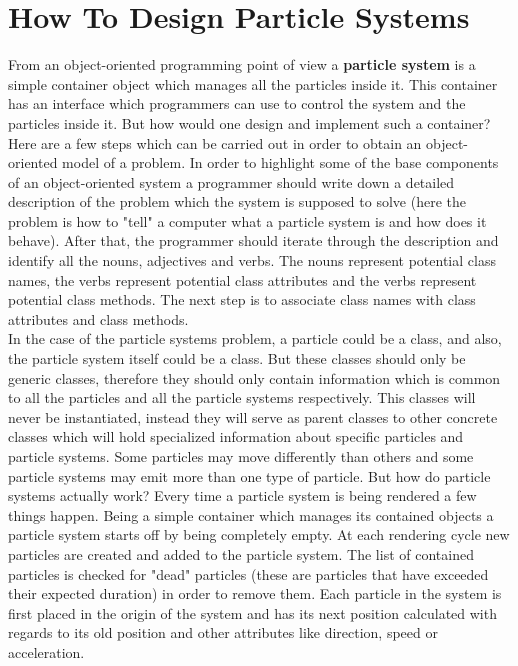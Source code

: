 \section{How To Design Particle Systems}
From an object-oriented programming point of view a \textbf{particle system} is a simple container object which manages all the particles inside it. This container has an interface which programmers can use to control the system and the particles inside it. But how would one design and implement such a container?\\

Here are a few steps which can be carried out in order to obtain an object-oriented model of a problem. In order to highlight some of the base components of an object-oriented system a programmer should write down a detailed description of the problem which the system is supposed to solve (here the problem is how to "tell" a computer what a particle system is and how does it behave). After that, the programmer should iterate through the description and identify all the nouns, adjectives and verbs. The nouns represent potential class names, the verbs represent potential class attributes and the verbs represent potential class methods. The next step is to associate class names with class attributes and class methods.\\

In the case of the particle systems problem, a particle could be a class, and also, the particle system itself could be a class. But these classes should only be generic classes, therefore they should only contain information which is common to all the particles and all the particle systems respectively. This classes will never be instantiated, instead they will serve as parent classes to other concrete classes which will hold specialized information about specific particles and particle systems. Some particles may move differently than others and some particle systems may emit more than one type of particle. But how do particle systems actually work? Every time a particle system is being rendered a few things happen. Being a simple container which manages its contained objects a particle system starts off by being completely empty. At each rendering cycle new particles are created and added to the particle system. The list of contained particles is checked for "dead" particles (these are particles that have exceeded their expected duration) in order to remove them. Each particle in the system is first placed in the origin of the system and has its next position calculated with regards to its old position and other attributes like direction, speed or acceleration.